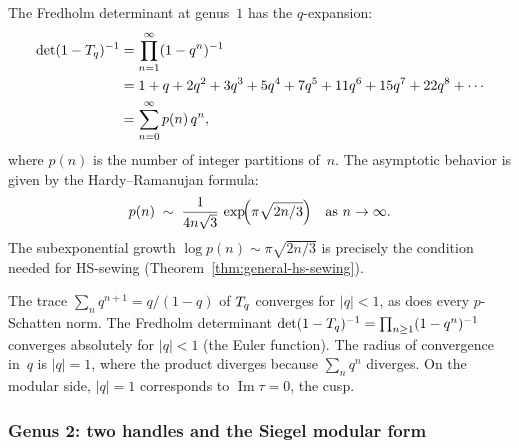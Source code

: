 \begin{computation}%
%
The Fredholm determinant at genus~$1$ has the $q$-expansion:
\begin{align}
\det(1 - T_q)^{-1}
&= \prod_{n=1}^{\infty} (1 - q^n)^{-1}
\notag\\
&= 1 + q + 2q^2 + 3q^3 + 5q^4 + 7q^5 + 11q^6 + 15q^7
+ 22q^8 + \cdots
\notag\\
&= \sum_{n=0}^{\infty} p(n)\,q^n,
\end{align}
where $p(n)$ is the number of integer partitions of~$n$.
The asymptotic behavior is given by the Hardy--Ramanujan formula:
\begin{equation}%
p(n) \;\sim\;
\frac{1}{4n\sqrt{3}}\,
\exp\!\Bigl(\pi\sqrt{2n/3}\Bigr)
\quad\text{as } n \to \infty.
\end{equation}
The subexponential growth $\log p(n) \sim \pi\sqrt{2n/3}$
is precisely the condition needed for HS-sewing
(Theorem~\ref{thm:general-hs-sewing}).
\end{computation}

\begin{remark}%
The trace $\sum_n q^{n+1} = q/(1-q)$ of $T_q$ converges
for $|q| < 1$, as does every $p$-Schatten norm.
The Fredholm determinant
$\det(1 - T_q)^{-1}
= \prod_{n\geq 1} (1 - q^n)^{-1}$
converges absolutely for $|q| < 1$ (the Euler function).
The radius of convergence in~$q$ is $|q| = 1$, where the
product diverges because $\sum_n q^n$ diverges.
On the modular side, $|q| = 1$ corresponds to
$\operatorname{Im}\tau = 0$, the cusp.
\end{remark}

\subsubsection{Genus 2: two handles and the Siegel modular form}
\label{subsec:thqg-genus2-fredholm}%

